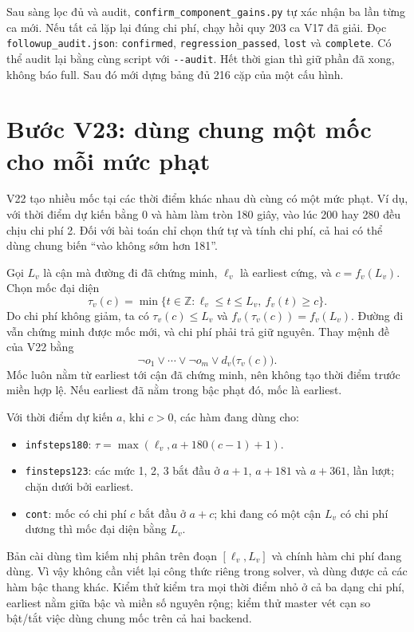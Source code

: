 \documentclass[11pt,a4paper]{article}
\newcommand{\code}[1]{\texttt{#1}}
\newcommand{\file}[1]{\nolinkurl{#1}}
\begin{document}
Sau sàng lọc đủ và audit, \file{confirm_component_gains.py} tự xác nhận
ba lần từng ca mới. Nếu tất cả lặp lại đúng chi phí, chạy hồi quy 203 ca
V17 đã giải. Đọc \file{followup_audit.json}: \code{confirmed},
\code{regression\_passed}, \code{lost} và \code{complete}. Có thể audit
lại bằng cùng script với \file{--audit}. Hết thời gian thì giữ phần đã
xong, không báo full. Sau đó mới dựng bảng đủ 216 cặp của một cấu hình.

\section{Bước V23: dùng chung một mốc cho mỗi mức phạt}

V22 tạo nhiều mốc tại các thời điểm khác nhau dù cùng có một mức phạt.
Ví dụ, với thời điểm dự kiến bằng 0 và hàm làm tròn 180 giây, vào lúc 200
hay 280 đều chịu chi phí 2. Đối với bài toán chỉ chọn thứ tự và tính chi
phí, cả hai có thể dùng chung biến ``vào không sớm hơn 181''.

Gọi $L_v$ là cận mà đường đi đã chứng minh, $\ell_v$ là earliest cứng,
và $c=f_v(L_v)$. Chọn mốc đại diện
\[
 \tau_v(c)=\min\{t\in\mathbb Z:\ell_v\leq t\leq L_v,\ f_v(t)\geq c\}.
\]
Do chi phí không giảm, ta có $\tau_v(c)\leq L_v$ và
$f_v(\tau_v(c))=f_v(L_v)$. Đường đi vẫn chứng minh được mốc mới, và chi
phí phải trả giữ nguyên. Thay mệnh đề của V22 bằng
\[
 \neg o_1\lor\cdots\lor\neg o_m\lor d_v\bigl(\tau_v(c)\bigr).
\]
Mốc luôn nằm từ earliest tới cận đã chứng minh, nên không tạo thời điểm
trước miền hợp lệ. Nếu earliest đã nằm trong bậc phạt đó, mốc là earliest.

Với thời điểm dự kiến $a$, khi $c>0$, các hàm đang dùng cho:
\begin{itemize}
\item \code{infsteps180}: $\tau=\max(\ell_v,a+180(c-1)+1)$.
\item \code{finsteps123}: các mức 1, 2, 3 bắt đầu ở $a+1$, $a+181$ và
$a+361$, lần lượt; chặn dưới bởi earliest.
\item \code{cont}: mốc có chi phí $c$ bắt đầu ở $a+c$; khi đang có một
cận $L_v$ có chi phí dương thì mốc đại diện bằng $L_v$.
\end{itemize}

Bản cài dùng tìm kiếm nhị phân trên đoạn $[\ell_v,L_v]$ và chính hàm chi
phí đang dùng. Vì vậy không cần viết lại công thức riêng trong solver,
và dùng được cả các hàm bậc thang khác. Kiểm thử kiểm tra mọi thời điểm
nhỏ ở cả ba dạng chi phí, earliest nằm giữa bậc và miền số nguyên rộng;
kiểm thử master vét cạn so bật/tắt việc dùng chung mốc trên cả hai backend.
\end{document}
